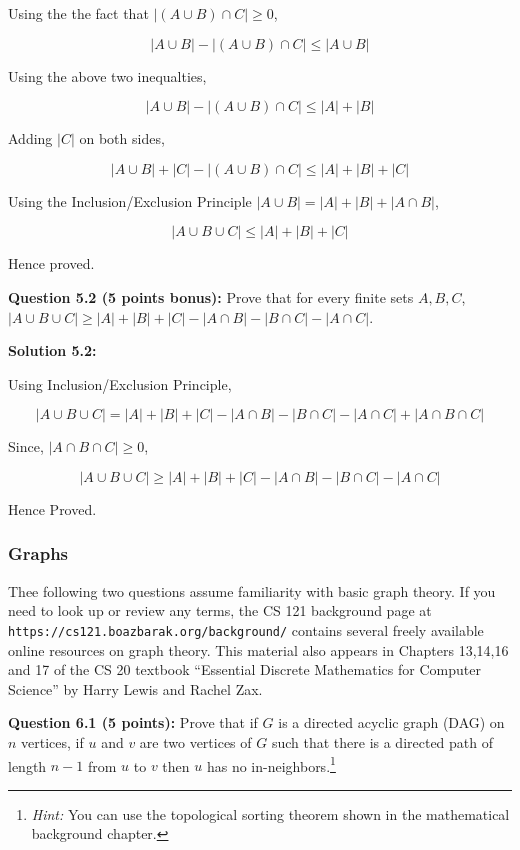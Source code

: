 \documentclass[11pt]{article}
\begin{document}
Using the the fact that $|(A \cup B) \cap C| \ge 0$,

$$
    |A \cup B| - |(A \cup B) \cap C| \le |A \cup B|
$$

Using the above two inequalties,

$$
|A \cup B| - |(A \cup B) \cap C| \le |A| + |B|
$$

Adding $|C|$ on both sides,

$$
|A \cup B| + |C| - |(A \cup B) \cap C| \le |A| + |B| + |C|
$$

Using the Inclusion/Exclusion Principle $|A \cup B| = |A| + |B| + |A \cap B|$,

$$
|A \cup B \cup C| \le |A| + |B| + |C|
$$

Hence proved.

\textbf{Question 5.2 (5 points bonus):} Prove that for every finite sets
\(A,B,C\),
\(|A \cup B \cup C| \geq |A|+|B|+|C| - |A \cap B| - |B \cap C| - |A \cap C|\).

\textbf{Solution 5.2:}

Using Inclusion/Exclusion Principle,

$$
|A \cup B \cup C| = |A| + |B| + |C| - |A \cap B| - |B \cap C| - |A \cap C|
+ |A \cap B \cap C|
$$

Since, $|A \cap B \cap C| \ge 0$,

$$
|A \cup B \cup C| \ge |A| + |B| + |C| - |A \cap B| - |B \cap C| - |A \cap C|
$$

Hence Proved.

\subsubsection{Graphs}\label{graphs}

Thee following two questions assume familiarity with basic graph theory.
If you need to look up or review any terms, the CS 121 background page at
{\tt https://cs121.boazbarak.org/background/}
contains several freely available online resources on graph theory. This
material also appears in Chapters 13,14,16 and 17 of the CS 20 textbook
``Essential Discrete Mathematics for Computer Science'' by Harry Lewis
and Rachel Zax.

\textbf{Question 6.1 (5 points):} Prove that if \(G\) is a directed
acyclic graph (DAG) on \(n\) vertices, if \(u\) and \(v\) are two
vertices of \(G\) such that there is a directed path of length \(n-1\)
from \(u\) to \(v\) then \(u\) has no in-neighbors.\footnote{\emph{Hint:}
You can use the topological sorting theorem shown in the mathematical
background chapter.}
\end{document}

